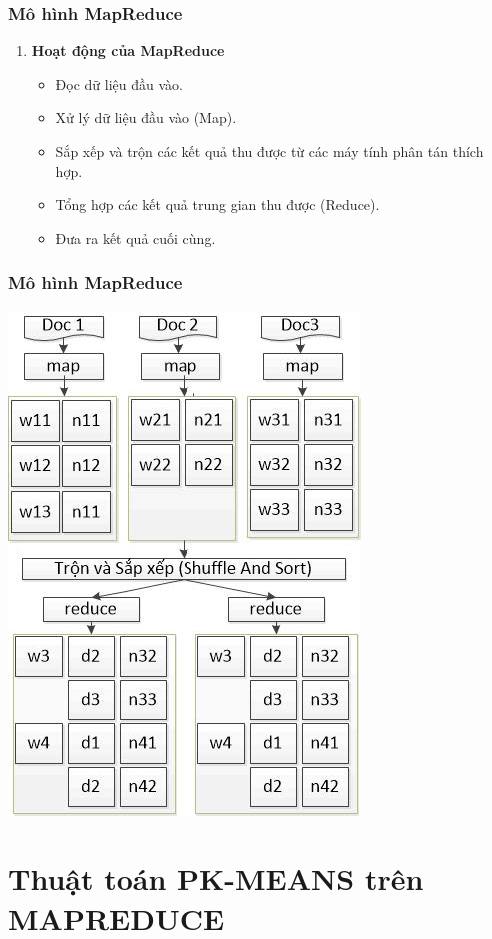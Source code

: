 \documentclass[12pt]{beamer}
\begin{document}
	\begin{frame}
		\frametitle{Mô hình MapReduce}
		\begin{enumerate} [\textbf{4.}]
			\item \textbf{Hoạt động của MapReduce}
				\begin{itemize}
					\item Đọc dữ liệu đầu vào.
					\item Xử lý dữ liệu đầu vào (Map).
					\item Sắp xếp và trộn các kết quả thu được từ các máy tính phân tán thích hợp.
					\item Tổng hợp các kết quả trung gian thu được (Reduce).
					\item Đưa ra kết quả cuối cùng.
				\end{itemize}
		\end{enumerate}
	\end{frame}
	
	\begin{frame}
		\frametitle{Mô hình MapReduce}
		\includegraphics[scale=0.9]{MapReduce.jpg}
	\end{frame}
	
	\section{Thuật toán PK-MEANS trên MAPREDUCE}
\end{document}
